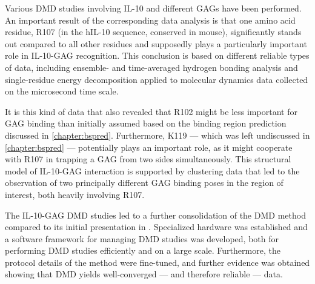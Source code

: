 Various DMD studies involving IL-10 and different GAGs have been performed. An
important result of the corresponding data analysis is that one amino acid
residue, R107 (in the hIL-10 sequence, conserved in mouse), significantly stands
out compared to all other residues and supposedly plays a particularly important
role in IL-10-GAG recognition. This conclusion is based on different reliable
types of data, including ensemble- and time-averaged hydrogen bonding analysis
and single-residue energy decomposition applied to molecular dynamics data
collected on the microsecond time scale.

It is this kind of data that also revealed that R102 might be less important for
GAG binding than initially assumed based on the binding region prediction
discussed in \cref{chapter:bspred}. Furthermore, K119 --- which was left
undiscussed in \cref{chapter:bspred} --- potentially plays an important role, as
it might cooperate with R107 in trapping a GAG from two sides simultaneously.
This structural model of IL-10-GAG interaction is supported by clustering data
that led to the observation of two principally different GAG binding poses in
the region of interest, both heavily involving R107.

The IL-10-GAG DMD studies led to a further consolidation of the DMD method
compared to its initial presentation in \cite{dmd_samsonov_gehrcke_2014}.
Specialized hardware was established and a software framework for managing DMD
studies was developed, both for performing DMD studies efficiently and on a
large scale. Furthermore, the protocol details of the method were fine-tuned,
and further evidence was obtained showing that DMD yields well-converged --- and
therefore reliable --- data.
